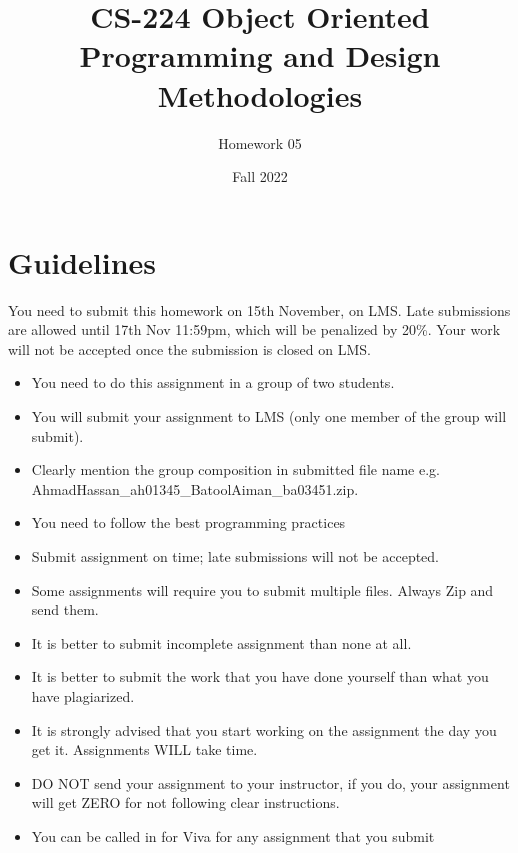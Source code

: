 \documentclass[a4paper,12pt]{article}
\begin{document}
	
	\title{CS-224 Object Oriented Programming and Design Methodologies }
	\author{Homework 05}
	\date{Fall 2022}
	\maketitle
	\section{Guidelines}
	
	You need to submit this homework on  {\color{blue}15th November}, on LMS. Late submissions are allowed until {\color{red} 17th Nov 11:59pm}, which will be penalized by 20\%. Your work will not be accepted once the submission is closed on LMS.

	
	\begin{itemize}
		\item You need to do this assignment in a group of two students.
		\item You will submit your assignment to LMS (only one member of the group will submit).
		\item Clearly mention the group composition in submitted file name e.g. AhmadHassan\_ah01345\_BatoolAiman\_ba03451.zip. 
		\item You need to follow the best programming practices 
		\item Submit assignment on time; late submissions will not be accepted.
		\item Some assignments will require you to submit multiple files. Always Zip and send them.
		\item It is better to submit incomplete assignment than none at all.
		\item It is better to submit the work that you have done yourself than what you have plagiarized.
		\item It is strongly advised that you start working on the assignment the day you get it. Assignments WILL take time.
		\item DO NOT send your assignment to your instructor, if you do, your assignment will get ZERO for not following clear instructions.
		\item You can be called in for Viva for any assignment that you submit
	\end{itemize}
	
\end{document}
